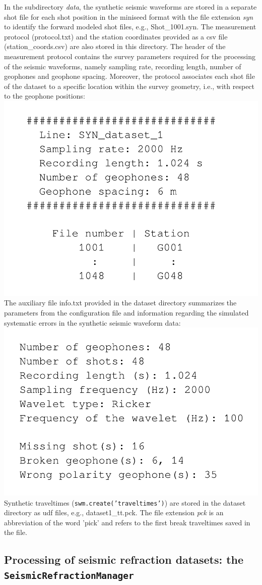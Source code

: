 \documentclass[a4paper,fleqn]{cas-sc}
\begin{document}
In the subdirectory \textit{data}, the synthetic seismic waveforms are stored in a separate shot file for each shot position in the miniseed format \citep{ahern2012, ringler2015} with the file extension \textit{syn} to identify the forward modeled shot files, e.g., Shot\_1001.syn.
The measurement protocol (protocol.txt) and the station coordinates provided as a csv file (station\_coords.csv) are also stored in this directory. The header of the measurement protocol contains the survey parameters required for the processing of the seismic waveforms, namely sampling rate, recording length, number of geophones and geophone spacing. Moreover, the protocol associates each shot file of the dataset to a specific location within the survey geometry, i.e., with respect to the geophone positions:
\newline
\includegraphics[width=.3\textwidth]{./figures/protocol.pdf}
\newline
The auxiliary file info.txt provided in the dataset directory summarizes the parameters from the configuration file and information regarding the simulated systematic errors in the synthetic seismic waveform data:
\newline
\includegraphics[width=.3\textwidth]{./figures/info.pdf}
\newline
Synthetic traveltimes (\texttt{swm.create('traveltimes')}) are stored in the dataset directory as udf files, e.g., dataset1\_tt.pck. The file extension \textit{pck} is an abbreviation of the word 'pick' and refers to the first break traveltimes saved in the file.

\subsection{Processing of seismic refraction datasets: the \texttt{SeismicRefractionManager}}
\end{document}
